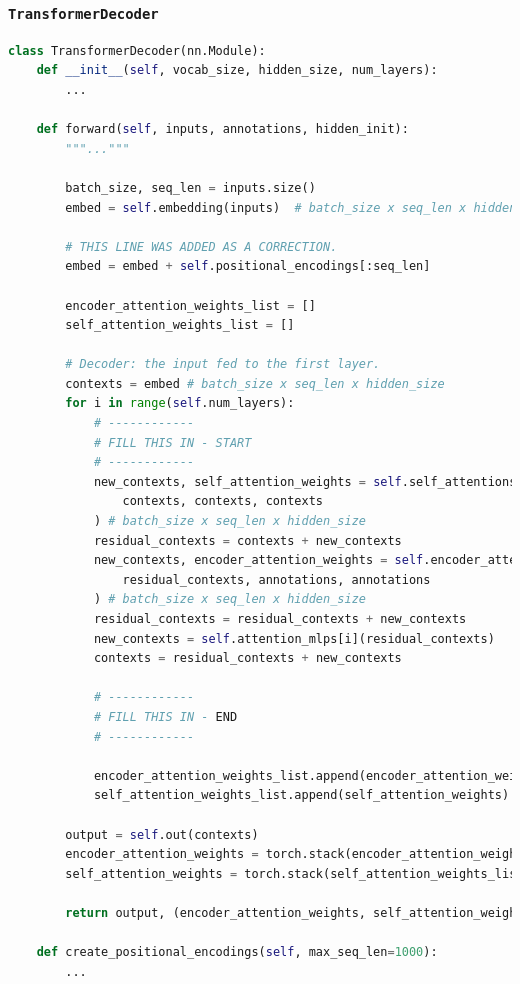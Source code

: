\documentclass{article}
\begin{document}
\subsubsection{\texttt{TransformerDecoder}}
\begin{lstlisting}[language=python]
class TransformerDecoder(nn.Module):
    def __init__(self, vocab_size, hidden_size, num_layers):
        ...

    def forward(self, inputs, annotations, hidden_init):
        """..."""
        
        batch_size, seq_len = inputs.size()
        embed = self.embedding(inputs)  # batch_size x seq_len x hidden_size 

        # THIS LINE WAS ADDED AS A CORRECTION. 
        embed = embed + self.positional_encodings[:seq_len]       

        encoder_attention_weights_list = []
        self_attention_weights_list = []

        # Decoder: the input fed to the first layer.
        contexts = embed # batch_size x seq_len x hidden_size 
        for i in range(self.num_layers):
            # ------------
            # FILL THIS IN - START
            # ------------
            new_contexts, self_attention_weights = self.self_attentions[i](
                contexts, contexts, contexts
            ) # batch_size x seq_len x hidden_size
            residual_contexts = contexts + new_contexts
            new_contexts, encoder_attention_weights = self.encoder_attentions[i](
                residual_contexts, annotations, annotations
            ) # batch_size x seq_len x hidden_size
            residual_contexts = residual_contexts + new_contexts
            new_contexts = self.attention_mlps[i](residual_contexts)
            contexts = residual_contexts + new_contexts

            # ------------
            # FILL THIS IN - END
            # ------------
          
            encoder_attention_weights_list.append(encoder_attention_weights)
            self_attention_weights_list.append(self_attention_weights)
          
        output = self.out(contexts)
        encoder_attention_weights = torch.stack(encoder_attention_weights_list)
        self_attention_weights = torch.stack(self_attention_weights_list)
        
        return output, (encoder_attention_weights, self_attention_weights)

    def create_positional_encodings(self, max_seq_len=1000):
    	...
\end{lstlisting}
\end{document}
